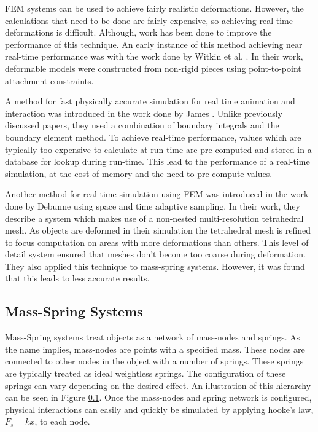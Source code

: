 FEM systems can be used to achieve fairly realistic deformations. However, the calculations that 
need to be done are fairly expensive, so achieving real-time deformations is difficult. Although,
work has been done to improve the performance of this technique.
An early instance of this method achieving near real-time performance was with the work done by 
Witkin et al. \cite{Fast-Animation-and-Control-of-Nonrigid-Structures}. In their work, deformable 
models were constructed from non-rigid pieces using point-to-point attachment constraints. 

A method for fast physically accurate simulation for real time animation and interaction was 
introduced in the work done by James \etal \cite{ArtDefo-Accurate-Real-Time}. 
Unlike previously discussed papers, they used a combination of boundary 
integrals and the boundary element method. To achieve real-time performance, values which are 
typically too expensive to calculate at run time are pre computed and stored in a database for 
lookup during run-time. This lead to the performance of a real-time simulation, at the cost of 
memory and the need to pre-compute values.

Another method for real-time simulation using FEM was introduced in the work done by Debunne \etal 
\cite{Dynamic-Real-Time-Deformations-Using} 
using space and time adaptive sampling. In their work, they describe a system which makes use of a 
non-nested multi-resolution tetrahedral mesh. As objects are deformed in their simulation the 
tetrahedral mesh is refined to focus computation on areas with more deformations than others. This 
level of detail system ensured that meshes don’t become too coarse during deformation. They also 
applied this technique to mass-spring systems. However, it was found that this leads to less 
accurate results.


\subsection{Mass-Spring Systems}


Mass-Spring systems treat objects as a network of mass-nodes and springs. As the name implies, 
mass-nodes are points with a specified mass. These nodes are connected to other nodes in the object
with a number of springs. These springs are typically treated as ideal weightless springs. The 
configuration of these springs can vary depending on the desired effect. An illustration of this 
hierarchy can be seen in Figure \ref{}.
Once the mass-nodes and 
spring network is configured, physical interactions can easily and quickly be simulated by applying
hooke's law, \(F_s = kx\), to each node. 

